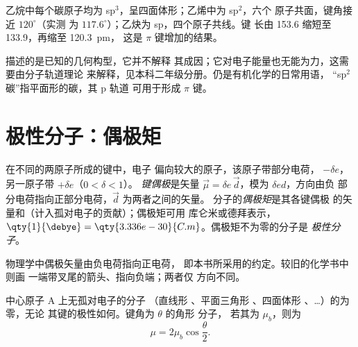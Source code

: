 \begin{example}[有机化学中的碳原子]\label{ex:b1:lewis-resonance-vsepr:carbon}
乙烷中每个碳原子均为 sp$^3$，呈四面体形；乙烯中为 sp$^2$，六个
原子共面，键角接近 $120^\circ$（实测 
为 $117.6^\circ$）；乙炔为 sp，四个原子共线。键
长由 153.6 缩短至 133.9，再缩至 \qty{120.3}{pm}，
这是 $\pi$ 键增加的结果。
\end{example}

\begin{remark}[描述而非原因]\label{rem:b1:lewis-resonance-vsepr:hybrid-limit}
描述的是已知的几何构型，它并不解释
其成因；它对电子能量也无能为力，这需要由分子轨道理论
来解释，见本科二年级分册。仍是有机化学的日常用语，
“sp$^2$ 碳”指平面形的碳，其 p 轨道
可用于形成 $\pi$ 键。
\end{remark}

\section{极性分子：偶极矩}

\begin{definition}\label{def:b1:lewis-resonance-vsepr:dipole}
在不同的两原子所成的键中，电子
偏向较大的原子，该原子带部分电荷，
$-\delta e$，另一原子带 $+\delta e$（$0 < \delta < 1$）。
\emph{键偶极}是矢量 $\vec\mu = \delta e\,
\vec d$，模为 $\delta e d$，方向由负
部分电荷指向正部分电荷，$\vec d$ 为两者之间的矢量。
分子的\emph{偶极矩}是其各键偶极
的矢量和（计入孤对电子的贡献）；偶极矩可用
库仑米或德拜表示，$\qty{1}{\debye} =
\qty{3.336e-30}{C.m}$。偶极矩不为零的分子是
\emph{极性分子}。
\end{definition}

\begin{remark}[方向约定]\label{rem:b1:lewis-resonance-vsepr:convention}
物理学中偶极矢量由负电荷指向正电荷，
即本书所采用的约定。较旧的化学书中则画
一端带叉尾的箭头、指向负端；两者仅
方向不同。
\end{remark}

\begin{proposition}[对称分子的偶极矩]\label{prop:b1:lewis-resonance-vsepr:dipole-sum}
中心原子 A 上无孤对电子的分子 （直线形 、平面三角形
、四面体形 、\dots）的为零，无论
其键的极性如何。键角为 $\theta$ 的角形  分子，
若其为 $\mu_b$，则为
\[
  \mu = 2\mu_b \cos\frac{\theta}{2} .
\]
\end{proposition}

